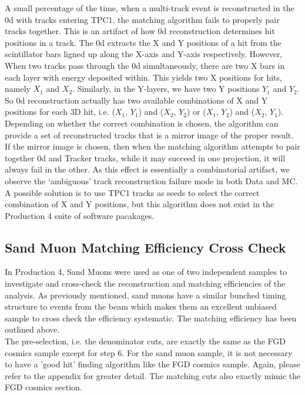 A small percentage of the time, when a multi-track event is reconstructed in the \p0d with tracks entering TPC1, the matching algorithm fails to properly pair tracks together. This is an artifact of how \p0d reconstruction determines hit positions in a track. The \p0d extracts the X and Y positions of a hit from the scintillator bars ligned up along the X-axis and Y-axis respectively. However, When two tracks pass through the \p0d simultaneously, there are two X bars in each layer with energy deposited within. This yields two X positions for hits, namely $X_1$ and $X_2$. Similarly, in the Y-layers, we have two Y positions  $Y_1$ and $Y_2$. So \p0d reconstruction actually has two available combinations of X and Y positions for each 3D hit, i.e. ($X_1$, $Y_1$) and ($X_2$, $Y_2$) or ($X_1$, $Y_2$) and ($X_2$, $Y_1$). Depending on whether the correct combination is chosen, the algorithm can provide a set of reconstructed tracks that is a mirror image of the proper result. If the mirror image is chosen, then when the matching algorithm attempts to pair together \p0d and Tracker tracks, while it may succeed in one projection, it will always fail in the other. As this effect is essentially a combinatorial artifact, we observe the `ambiguous' track reconstruction failure mode in both Data and MC. A possible solution is to use TPC1 tracks as seeds to select the correct combination of X and Y positions, but this algorithm does not exist in the Production 4 suite of software pacakages.

\subsection{Sand Muon Matching Efficiency Cross Check}
\label{sec:Appendix_sandmuoneff}

In Production 4, Sand Muons were used as one of two independent samples 
to investigate and cross-check the reconstruction and matching efficiencies of the analysis. 
As previously mentioned, sand muons have a similar bunched timing structure 
to events from the beam which makes them an excellent unbiased sample 
to cross check the efficiency systematic. 
The matching efficiency has been outlined above.\\

The pre-selection, i.e. the denominator cuts, 
are exactly the same as the FGD cosmics sample 
except for step 6. 
For the sand muon sample, it is not necessary to have 
a 'good hit' finding algorithm like the FGD cosmics sample. 
Again, please refer to the appendix for greater detail. 
The matching cuts also exactly mimic the FGD cosmics section.\\


